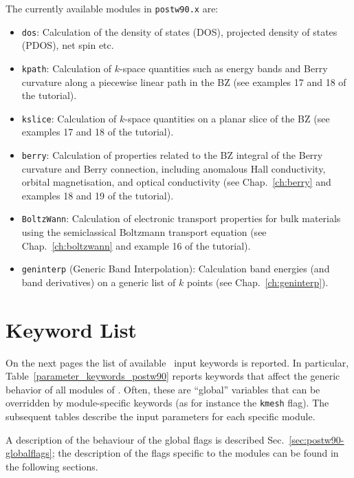 The currently available modules in \texttt{postw90.x} are:
\begin{itemize}
\item \texttt{dos}: Calculation of the density of states (DOS), projected
  density of states (PDOS), net spin etc.
\item \texttt{kpath}: Calculation of $k$-space quantities such as
  energy bands and Berry curvature along a piecewise linear path in
  the BZ (see examples 17 and 18 of the tutorial).
\item \texttt{kslice}: Calculation of $k$-space quantities on a planar
  slice of the BZ (see examples 17 and 18 of the tutorial).
\item \texttt{berry}: Calculation of properties related to the BZ
  integral of the Berry curvature and Berry connection, including
  anomalous Hall conductivity, orbital magnetisation, and optical
  conductivity (see Chap.~\ref{ch:berry} and examples 18 and 19 of the
  tutorial).
\item \texttt{BoltzWann}: Calculation of electronic transport
  properties for bulk materials using the semiclassical Boltzmann
  transport equation (see Chap.~\ref{ch:boltzwann} and example 16 of
  the tutorial).
\item \texttt{geninterp} (Generic Band Interpolation): Calculation band energies (and band
  derivatives) on a generic list of $k$ points (see Chap.~\ref{ch:geninterp}).
\end{itemize}


\section{Keyword List}
On the next pages the list of available \postw\ input keywords is
reported.  In particular, Table~\ref{parameter_keywords_postw90}
reports keywords that affect the generic behavior of all modules of
\postw. Often, these are ``global'' variables that can be overridden
by module-specific keywords (as for instance the {\tt kmesh}
flag). The subsequent tables describe the input parameters for each
specific module.

A description of the behaviour of the global flags is described
Sec.~\ref{sec:postw90-globalflags}; the description of the flags
specific to the modules can be found in the following sections.

\clearpage

